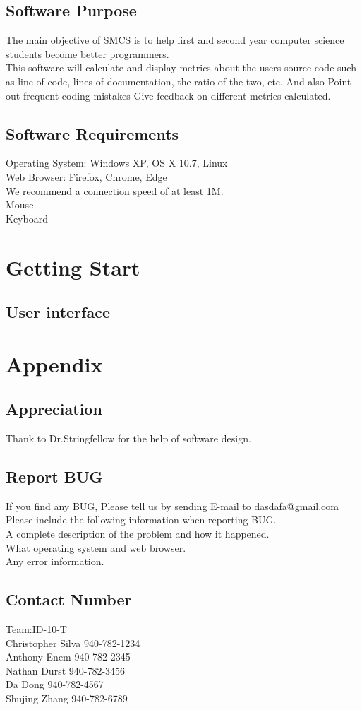 \documentclass{scrreprt}
\begin{document}
	\section{Software Purpose}
	The main objective of SMCS is to help first and second year computer science students become better programmers.\\
	This software will calculate and display metrics about the users source code such as line of code, lines of documentation, the ratio of the two, etc. And also Point out frequent coding mistakes
	Give feedback on different metrics calculated.

	\section{Software Requirements}
	Operating System: Windows XP, OS X 10.7, Linux\\
	Web Browser: Firefox, Chrome, Edge\\
	We recommend a connection speed of at least 1M.\\
	Mouse\\
	Keyboard\\

	\chapter{Getting Start}
	\section{User interface}
	
	\chapter{Appendix}
	\section{Appreciation}
	Thank to Dr.Stringfellow for the help of software design. 
	\section{Report BUG}
	If you find any BUG, Please tell us by sending E-mail to dasdafa@gmail.com\\
	Please include the following information when reporting BUG.\\
	A complete description of the problem and how it happened.\\
	What operating system and web browser.\\
	Any error information.
	\section{Contact Number}
		Team:ID-10-T\\
		 Christopher Silva	940-782-1234\\
		Anthony Enem 		940-782-2345\\
		Nathan Durst		940-782-3456\\
		Da Dong			940-782-4567\\
		Shujing Zhang 		940-782-6789\\
\end{document}
